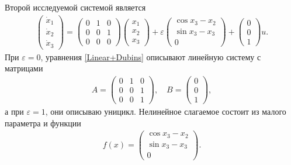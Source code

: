 \documentclass[../main.tex]{subfiles}
\begin{document}
\begin{pr}  
    Второй исследуемой системой является
    \begin{gather}\label{Linear+Dubins}
        \begin{pmatrix} 
            \dot{x}_1 \\
            \dot{x}_2 \\ 
            \dot{x}_3 \end{pmatrix} = 
        \begin{pmatrix}
            0 & 1 & 0 \\
            0 & 0 & 1 \\
            0 & 0 & 0
        \end{pmatrix}
        \begin{pmatrix} 
            x_1 \\
            x_2 \\ 
            x_3 \end{pmatrix} + 
        \varepsilon
        \begin{pmatrix}
            \cos x_3 - x_2\\
            \sin x_3 - x_3 \\
            0
        \end{pmatrix} + 
        \begin{pmatrix}
            0 \\ 0 \\ 1
        \end{pmatrix} u.
    \end{gather}
    При $\varepsilon = 0$, уравнения \eqref{Linear+Dubins} описывают линейную систему с матрицами 
    \begin{gather*}
        A = \begin{pmatrix} 0 & 1 & 0\\
            0 & 0 & 1\\ 
            0 & 0 & 1 
        \end{pmatrix}, \quad B = \begin{pmatrix}
            0\\
            0\\
            1
        \end{pmatrix},
    \end{gather*}
    а при $\varepsilon = 1$, они описываю уницикл. 
    Нелинейное слагаемое состоит из малого параметра и функции
    \begin{gather*}
        f(x) = \begin{pmatrix}
            \cos x_3 - x_2\\
            \sin x_3 - x_3 \\
            0
        \end{pmatrix}.
    \end{gather*}
    

\end{pr}
\end{document}
